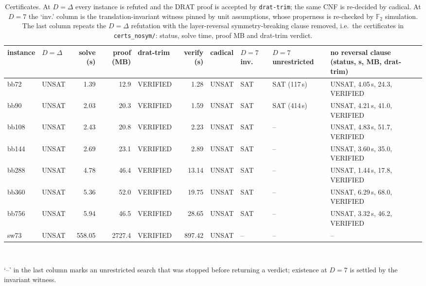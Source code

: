 \begin{table}[tb]
\centering
\small
\caption{Certificates. At $D=\Delta$ every instance is refuted and the DRAT proof is accepted by \texttt{drat-trim}; the same CNF is re-decided by cadical. At $D=7$ the `inv.' column is the translation-invariant witness pinned by unit assumptions, whose properness is re-checked by $\mathbb{F}_2$ simulation.  The last column repeats the $D=\Delta$ refutation with the layer-reversal symmetry-breaking clause removed, i.e.\ the certificates in \texttt{certs\_nosym/}: status, solve time, proof MB and drat-trim verdict.}
\label{tab:certificates}
\begin{tabular}{llrrlrllll}
\toprule
instance & $D=\Delta$ & solve (s) & proof (MB) & drat-trim & verify (s) & cadical & $D=7$ inv. & $D=7$ unrestricted & no reversal clause (status, s, MB, drat-trim) \\
\midrule
bb72 & UNSAT & 1.39 & 12.9 & VERIFIED & 1.28 & UNSAT & SAT & SAT (117\,s) & UNSAT, 4.05\,s, 24.3, VERIFIED \\
bb90 & UNSAT & 2.03 & 20.3 & VERIFIED & 1.59 & UNSAT & SAT & SAT (414\,s) & UNSAT, 4.21\,s, 41.0, VERIFIED \\
bb108 & UNSAT & 2.43 & 20.8 & VERIFIED & 2.23 & UNSAT & SAT & -- & UNSAT, 4.83\,s, 51.7, VERIFIED \\
bb144 & UNSAT & 2.69 & 23.1 & VERIFIED & 2.89 & UNSAT & SAT & -- & UNSAT, 3.60\,s, 35.0, VERIFIED \\
bb288 & UNSAT & 4.78 & 46.4 & VERIFIED & 13.14 & UNSAT & SAT & -- & UNSAT, 1.44\,s, 17.8, VERIFIED \\
bb360 & UNSAT & 5.36 & 52.0 & VERIFIED & 19.75 & UNSAT & SAT & -- & UNSAT, 6.29\,s, 68.0, VERIFIED \\
bb756 & UNSAT & 5.94 & 46.5 & VERIFIED & 28.65 & UNSAT & SAT & -- & UNSAT, 3.32\,s, 46.2, VERIFIED \\
sw73 & UNSAT & 558.05 & 2727.4 & VERIFIED & 897.42 & UNSAT & -- & -- & -- \\
\bottomrule
\end{tabular}
\\[2pt]\begin{minipage}{\linewidth}\footnotesize `--' in the last column marks an unrestricted search that was stopped before returning a verdict; existence at $D=7$ is settled by the invariant witness.\end{minipage}
\end{table}
